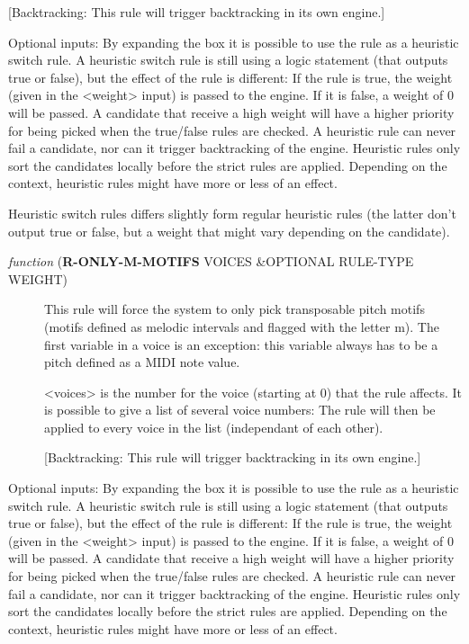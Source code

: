 [Backtracking: This rule will trigger backtracking in its own engine.]


Optional inputs:
By expanding the box it is possible to use the rule as a heuristic switch 
rule. A heuristic switch rule is still using a logic statement (that 
outputs true or false), but the effect of the rule is different: If the rule 
is true, the weight (given in the <weight> input) is passed to the engine. 
If it is false, a weight of 0 will be passed. A candidate that receive a 
high weight will have a higher priority for being picked when the true/false 
rules are checked. A heuristic rule can never fail a candidate, nor can it 
trigger backtracking of the engine. Heuristic rules only sort the 
candidates locally before the strict rules are applied. Depending on the 
context, heuristic rules might have more or less of an effect. 

Heuristic switch rules differs slightly form regular heuristic rules (the 
latter don't output true or false, but a weight that might vary depending
on the candidate).


\begin{description}
\item[{ \emph{function} (\textbf{R-ONLY-M-MOTIFS} VOICES \&OPTIONAL RULE-TYPE WEIGHT)}] This rule will force the system to only pick transposable pitch
motifs (motifs defined as melodic intervals and flagged with the 
letter m). The first variable in a voice is an exception: this 
variable always has to be a pitch defined as a MIDI note value.

<voices> is the number for the voice (starting at 0) that the rule affects. 
It is possible to give a list of several voice numbers: The rule will then 
be applied to every voice in the list (independant of each other).

[Backtracking: This rule will trigger backtracking in its own engine.]
\end{description}


Optional inputs:
By expanding the box it is possible to use the rule as a heuristic switch 
rule. A heuristic switch rule is still using a logic statement (that 
outputs true or false), but the effect of the rule is different: If the rule 
is true, the weight (given in the <weight> input) is passed to the engine. 
If it is false, a weight of 0 will be passed. A candidate that receive a 
high weight will have a higher priority for being picked when the true/false 
rules are checked. A heuristic rule can never fail a candidate, nor can it 
trigger backtracking of the engine. Heuristic rules only sort the 
candidates locally before the strict rules are applied. Depending on the 
context, heuristic rules might have more or less of an effect. 

